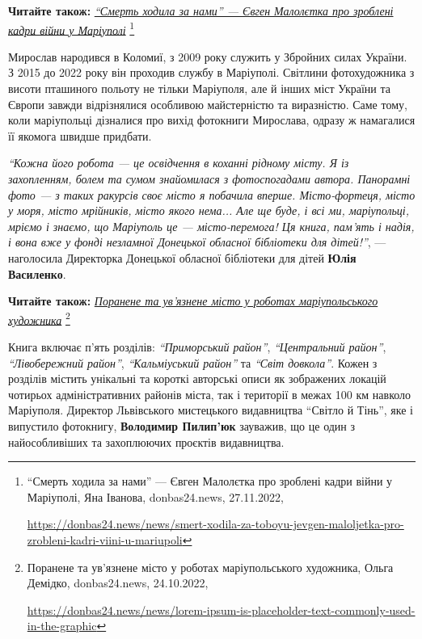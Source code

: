 
\textbf{Читайте також:} \href{https://donbas24.news/news/smert-xodila-za-toboyu-jevgen-maloljetka-pro-zrobleni-kadri-viini-u-mariupoli}{\emph{\enquote{Смерть ходила за нами} — Євген Малолєтка про зроблені кадри війни у Маріуполі}}%
\footnote{\enquote{Смерть ходила за нами} — Євген Малолєтка про зроблені кадри війни у Маріуполі, Яна Іванова, donbas24.news, 27.11.2022, \par%
\url{https://donbas24.news/news/smert-xodila-za-toboyu-jevgen-maloljetka-pro-zrobleni-kadri-viini-u-mariupoli}%
}

Мирослав народився в Коломиї, з 2009 року служить у Збройних силах України. З
2015 до 2022 року він проходив службу в Маріуполі. Світлини фотохудожника з
висоти пташиного польоту не тільки Маріуполя, але й інших міст України та
Європи завжди відрізнялися особливою майстерністю та виразністю. Саме тому,
коли маріупольці дізналися про вихід фотокниги Мирослава, одразу ж намагалися
її якомога швидше придбати.

\begin{leftbar}
\emph{\enquote{Кожна його робота — це освідчення в коханні рідному місту. Я із захопленням,
болем та сумом знайомилася з фотоспогадами автора. Панорамні фото — з
таких ракурсів своє місто я побачила вперше. Місто-фортеця, місто у
моря, місто мрійників, місто якого нема... Але ще буде, і всі ми,
маріупольці, мріємо і знаємо, що Маріуполь це — місто-перемога!  Ця
книга, пам'ять і надія, і вона вже у фонді незламної Донецької обласної
бібліотеки для дітей!}}, — наголосила Директорка Донецької обласної
бібліотеки для дітей \textbf{Юлія Василенко}.
\end{leftbar}

\textbf{Читайте також:} \href{https://donbas24.news/news/lorem-ipsum-is-placeholder-text-commonly-used-in-the-graphic}{\emph{Поранене та ув'язнене місто у роботах маріупольського художника}}%
\footnote{Поранене та ув'язнене місто у роботах маріупольського художника, Ольга Демідко, donbas24.news, 24.10.2022, \par%
\url{https://donbas24.news/news/lorem-ipsum-is-placeholder-text-commonly-used-in-the-graphic}%
}


Книга включає п'ять розділів: \emph{\enquote{Приморський район}}, \emph{\enquote{Центральний район}},
\emph{\enquote{Лівобережний район}}, \emph{\enquote{Кальміуський район}} та \emph{\enquote{Світ довкола}}. Кожен з розділів
містить унікальні та короткі авторські описи як зображених локацій чотирьох
адміністративних районів міста, так і території в межах 100 км навколо
Маріуполя. Директор Львівського мистецького видавництва \enquote{Світло й Тінь}, яке і
випустило фотокнигу, \textbf{Володимир Пилип'юк} зауважив, що це один з найособливіших
та захоплюючих проєктів видавництва.

